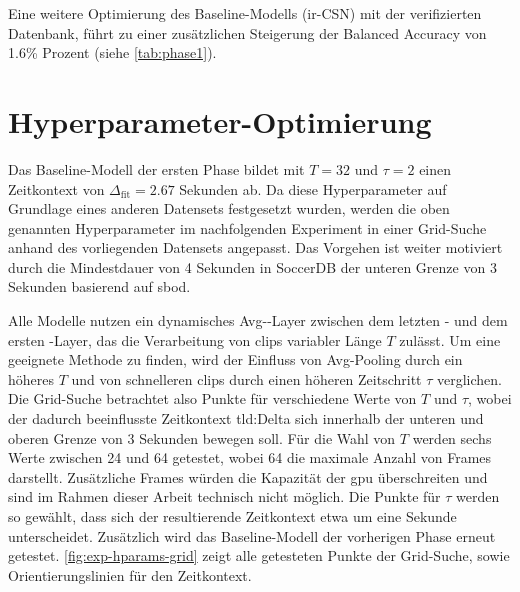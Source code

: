 Eine weitere Optimierung des Baseline-Modells (ir-CSN) mit der verifizierten Datenbank, führt zu einer zusätzlichen Steigerung der Balanced Accuracy von 1.6\% Prozent (siehe \autoref{tab:phase1}).

\section{Hyperparameter-Optimierung}
\label{sec:hyperparameter-optimierung}

Das Baseline-Modell der ersten Phase bildet mit $T=32$ und $\tau = 2$ einen Zeitkontext von $\Delta_\text{fit}=2.67$ Sekunden ab.
Da diese Hyperparameter auf Grundlage eines anderen Datensets festgesetzt wurden, werden die oben genannten Hyperparameter im nachfolgenden Experiment in einer Grid-Suche anhand des vorliegenden Datensets angepasst.
Das Vorgehen ist weiter motiviert durch die Mindestdauer von 4 Sekunden in SoccerDB \bzw der unteren Grenze von 3 Sekunden basierend auf \gls{sbod}.

Alle Modelle nutzen ein dynamisches Avg-\pool-Layer zwischen dem letzten \conv- und dem ersten \fc-Layer, das die Verarbeitung von \glspl{clip} variabler Länge $T$ zulässt.
Um eine geeignete Methode zu finden, wird der Einfluss von Avg-Pooling durch ein höheres $T$ und von schnelleren \glspl{clip} durch einen höheren Zeitschritt $\tau$ verglichen.
Die Grid-Suche betrachtet also Punkte für verschiedene Werte von $T$ und $\tau$, wobei der dadurch beeinflusste Zeitkontext \gls{tld:Delta} sich innerhalb der unteren und oberen Grenze von 3  Sekunden bewegen soll.
Für die Wahl von $T$ werden sechs Werte zwischen 24 und 64 getestet, wobei 64 die maximale Anzahl von Frames darstellt.
Zusätzliche Frames würden die Kapazität der \gls{gpu} überschreiten und sind im Rahmen dieser Arbeit technisch nicht möglich.
Die Punkte für $\tau$ werden so gewählt, dass sich der resultierende Zeitkontext etwa um eine Sekunde unterscheidet.
Zusätzlich wird das Baseline-Modell der vorherigen Phase erneut getestet.
\autoref{fig:exp-hparams-grid} zeigt alle getesteten Punkte der Grid-Suche, sowie Orientierungslinien für den Zeitkontext.

